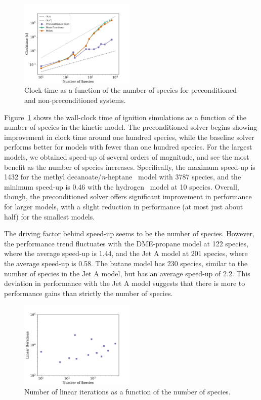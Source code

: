 \documentclass[twocolumn,10pt]{article} %
\begin{document}
\begin{figure}[htb]
\centering
\includegraphics[width=0.49\textwidth]{symposium-22/Clocktime-Nspecies.pdf}
\caption{Clock time as a function of the number of species for preconditioned and non-preconditioned systems.}
\label{f:clocktime-nspecies}
\end{figure}

Figure~\ref{f:clocktime-nspecies} shows the wall-clock time of ignition simulations as a function of the number of species in the kinetic model.
The preconditioned solver begins showing improvement in clock time around one hundred species, while the baseline solver performs better for models with fewer than one hundred species.
For the largest models, we obtained speed-up of several orders of magnitude, and see the most benefit as the number of species increases.
Specifically, the maximum speed-up is 1432 for the methyl decanoate\slash \textit{n}-heptane~\cite{herbinet_detailed_2010} model with 3787 species, and the minimum speed-up is 0.46 with the hydrogen~\cite{smith_gri-mech_1999} model at 10 species.
Overall, though, the preconditioned solver offers significant improvement in performance for larger models, with a slight reduction in performance (at most just about half) for the smallest models.


The driving factor behind speed-up seems to be the number of species.
However, the performance trend fluctuates with the DME-propane model at 122 species, where the average speed-up is 1.44, and the Jet A model at 201 species, where the average speed-up is 0.58.
The butane model has 230 species, similar to the number of species in the Jet A model, but has an average speed-up of 2.2.
This deviation in performance with the Jet A model suggests that there is more to performance gains than strictly the number of species.

\begin{figure}[htb]
\centering
\includegraphics[width=0.49\textwidth]{symposium-22/LinIters-Nspecies.pdf}
\caption{Number of linear iterations as a function of the number of species.}
\label{fig:lin-iters-log}
\end{figure}
\end{document}
